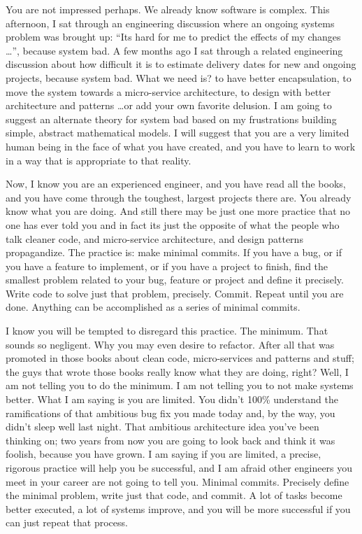 You are not impressed perhaps. We already know software is complex. This afternoon, I sat through an engineering discussion where an ongoing systems problem
was brought up:
``Its hard for me to predict the effects of my changes \dots'', because system bad. A few months ago I sat through a related engineering discussion about how
difficult it is to estimate delivery dates for new and ongoing projects, because system bad. What we need is? \- to have better encapsulation, to move the system
towards a micro-service architecture, to design with better architecture and patterns \dots or add your own favorite delusion. I am going to suggest an alternate theory for system
bad based on my frustrations building simple, abstract mathematical models. I will suggest that you are a very limited human being in the face of what you have created, and you have
to learn to work in a way that is appropriate to that reality.

Now, I know you are an experienced engineer, and you have read all the books, and you have come through the toughest, largest projects there are. You already
know what you are doing. And still there may be just one more practice that no one has ever told you and in fact its just the opposite of what the people who
talk cleaner code, and micro-service architecture, and design patterns propagandize. The practice is: make minimal commits. If you have a bug, or if you have
a feature to implement, or if you have a project to finish, find the smallest problem related to your bug, feature or project and define it precisely.
Write code to solve just that problem, precisely. Commit. Repeat until you are done. Anything can be accomplished as a series of minimal commits.

I know you will be tempted to disregard this practice. The minimum. That sounds so negligent. Why you may even desire to refactor. After all that was promoted in those
books about clean code, micro-services and patterns and stuff; the guys that wrote those books really know what they are doing, right? Well, I am not telling you to do the minimum. I am not telling
you to not make systems better. What I am saying is you are limited. You didn't 100\% understand the ramifications of that ambitious bug fix you made today and,
by the way, you didn't sleep well last night. That ambitious architecture idea you've been thinking on; two years from now you are going to look back and think
it was foolish, because you have grown. I am saying if you are limited, a precise, rigorous practice will help you be successful, and I am afraid other engineers
you meet in your career are not going to tell you. Minimal commits. Precisely define the minimal problem, write just that code, and commit. A lot of tasks
become better executed, a lot of systems improve, and you will be more successful if you can just repeat that process.

